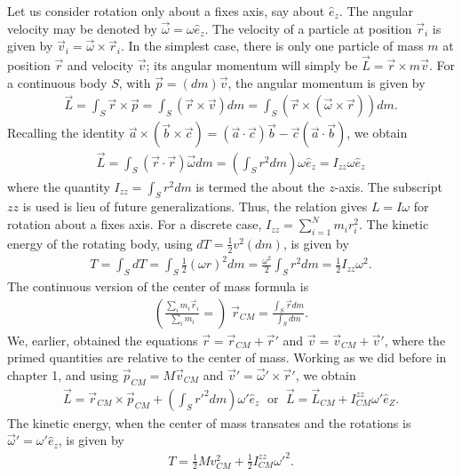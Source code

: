 Let us consider rotation only about a fixes axis, say about $\hat{e}_{z}$. The angular velocity may be denoted by $\vec{\omega} = \omega \hat{e}_{z}$. The velocity of a particle at position $\vec{r}_{i}$ is given by $\vec{v}_{i} = \vec{\omega} \times \vec{r}_{i}$. In the simplest case, there is only one particle of mass $m$ at position $\vec{r}$ and velocity $\vec{v}$; its angular momentum will simply be $\vec{L} = \vec{r} \times m \vec{v}$. For a continuous body $S$, with $\vec{p} = (dm) \vec{v}$, the angular momentum is given by
\begin{align}
    \vec{L} = \int_{S} \vec{r} \times \vec{p} = \int_{S} (\vec{r} \times \vec{v}) dm = \int_{S} (\vec{r} \times (\vec{\omega} \times \vec{r})) dm.
\end{align}
Recalling the identity $\vec{a} \times (\vec{b} \times \vec{c}) = (\vec{a} \cdot \vec{c}) \vec{b} - \vec{c} (\vec{a} \cdot \vec{b})$, we obtain
\begin{align}
    \vec{L} = \int_{S} (\vec{r} \cdot \vec{r}) \vec{\omega} dm = \left( \int_{S} r^{2} dm \right) \omega \hat{e}_{z} = I_{zz} \omega \hat{e}_{z}
\end{align}
where the quantity $I_{zz} = \int_{S} r^{2} dm$ is termed the  about the $z$-axis. The subscript $zz$ is used is lieu of future generalizations. Thus, the relation gives $L = I \omega$ for rotation about a fixes axis. For a discrete case, $I_{zz} = \sum_{i=1}^{N} m_{i} r_{i}^{2}$. The kinetic energy of the rotating body, using $dT = \frac{1}{2}v^{2}(dm)$, is given by
\begin{align}
    T = \int_{S} dT = \int_{S} \frac{1}{2} (\omega r)^{2} dm = \frac{\omega^{2}}{2} \int_{S} r^{2} dm = \frac{1}{2} I_{zz} \omega^{2}.
\end{align}
The continuous version of the center of mass formula is
\begin{align}
    \left( \frac{\sum_{i} m_{i} \vec{r}_{i}}{\sum_{i} m_{i}} = \right)\; \vec{r}_{CM} = \frac{\int_{S} \vec{r} dm}{\int_{S} dm}.
\end{align}
We, earlier, obtained the equations $\vec{r} = \vec{r}_{CM} + \vec{r}'$ and $\vec{v} = \vec{v}_{CM} + \vec{v}'$, where the primed quantities are relative to the center of mass. Working as we did before in chapter 1, and using $\vec{p}_{CM} = M\vec{v}_{CM}$ and $\vec{v}' = \vec{\omega}' \times \vec{r}'$, we obtain
\begin{align}
    \vec{L} = \vec{r}_{CM} \times \vec{p}_{CM} + \left( \int_{S} r'^{2} dm \right) \omega' \hat{e}_{z}\; \text{ or }\; \vec{L} = \vec{L}_{CM} + I_{CM}^{zz} \omega' \hat{e}_{Z}.
\end{align}
The kinetic energy, when the center of mass transates and the rotations is $\vec{\omega}' = \omega' \hat{e}_{z}$, is given by
\begin{align}
    T = \frac{1}{2} M v_{CM}^{2} + \frac{1}{2} I_{CM}^{zz} \omega'^{2}.
\end{align}

